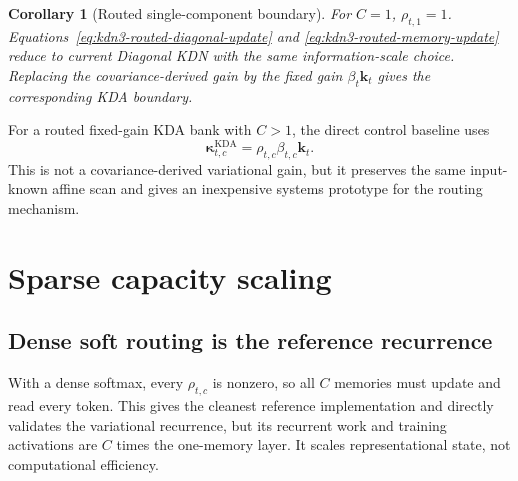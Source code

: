 \documentclass[11pt]{article}
\newcommand{\ve}[1]{\boldsymbol{#1}}
\newtheorem{corollary}{Corollary}
\begin{document}
\begin{corollary}[Routed single-component boundary]
For $C=1$, $\rho_{t,1}=1$.  Equations~\eqref{eq:kdn3-routed-diagonal-update} and
\eqref{eq:kdn3-routed-memory-update} reduce to current Diagonal KDN with the same information-scale
choice.  Replacing the covariance-derived gain by the fixed gain
$\beta_t\ve{k}_t$ gives the corresponding KDA boundary.
\end{corollary}

For a routed fixed-gain KDA bank with $C>1$, the direct control baseline uses
\begin{equation}
  \ve{\kappa}_{t,c}^{\mathrm{KDA}}
  =\rho_{t,c}\beta_{t,c}\ve{k}_t.
  \label{eq:kdn3-routed-kda-gain}
\end{equation}
This is not a covariance-derived variational gain, but it preserves the same input-known affine
scan and gives an inexpensive systems prototype for the routing mechanism.

\section{Sparse capacity scaling}
\label{sec:kdn3-sparse-scaling}

\subsection{Dense soft routing is the reference recurrence}

With a dense softmax, every $\rho_{t,c}$ is nonzero, so all $C$ memories must update and read every
token.  This gives the cleanest reference implementation and directly validates the variational
recurrence, but its recurrent work and training activations are $C$ times the one-memory layer.
It scales representational state, not computational efficiency.
\end{document}
